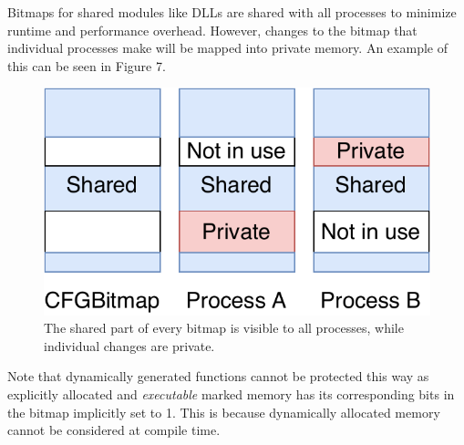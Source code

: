 \documentclass[10pt,twocolumn,a4paper]{article}
\begin{document}
Bitmaps for shared modules like DLLs are shared with all processes to minimize runtime and performance overhead. However, changes to the bitmap that individual processes make will be mapped into private memory\cite{cfginternals}. An example of this can be seen in Figure 7.
\begin{figure}[h]
	\includegraphics[keepaspectratio,width=\linewidth]{fig/bitmap}
	\caption{The shared part of every bitmap is visible to all processes, while individual changes are private\cite{cfgexplore}.}
\end{figure}
\newpage Note that dynamically generated functions cannot be protected this way as explicitly allocated and \emph{executable} marked memory has its corresponding bits in the bitmap implicitly set to 1\cite{cfgexplore}.
This is because dynamically allocated memory cannot be considered at compile time.
\end{document}
